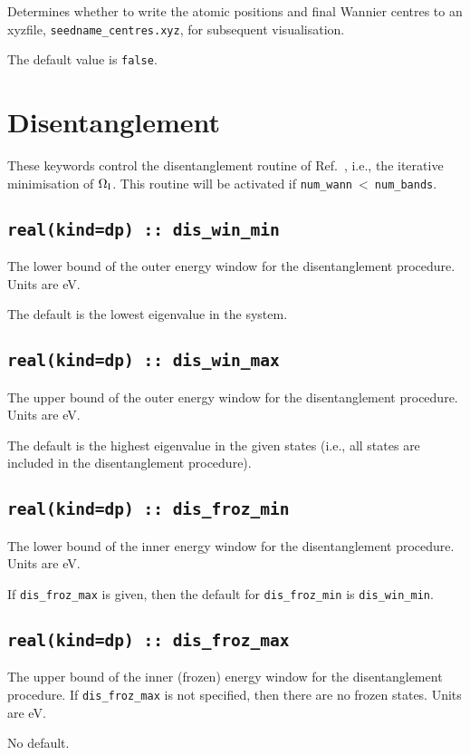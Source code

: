 Determines whether to write the atomic positions and 
final Wannier centres to an xyzfile,
\verb#seedname_centres.xyz#, for subsequent
visualisation. 

The default value is \verb#false#.


\section{Disentanglement}
These keywords control the disentanglement routine of
Ref.~\cite{SMV}, i.e., the iterative minimisation of $\Omega_{\mathrm{I}}$. This
routine will be activated if \verb#num_wann#$\:<\:$\verb#num_bands#.


\subsection[dis\_win\_min]{\tt real(kind=dp) :: dis\_win\_min}
The lower bound of the outer energy window for the disentanglement
procedure. Units are eV.

The default is the lowest eigenvalue in the system.

\subsection[dis\_win\_max]{\tt real(kind=dp) :: dis\_win\_max}
The upper bound of the outer energy window for the disentanglement
procedure. Units are eV.

The default is the highest eigenvalue in the given states (i.e., all states
are included in the disentanglement procedure).

\subsection[dis\_froz\_min]{\tt real(kind=dp) :: dis\_froz\_min}
The lower bound of the inner energy window for the disentanglement
procedure.  Units are eV.

If \verb#dis_froz_max# is given, then the default for 
\verb#dis_froz_min# is \verb#dis_win_min#.


\subsection[dis\_froz\_max]{\tt real(kind=dp) :: dis\_froz\_max}
The upper bound of the inner (frozen) energy window for the
disentanglement procedure. If \verb#dis_froz_max# is not specified,
then there are no frozen states. Units are eV.

No default.

